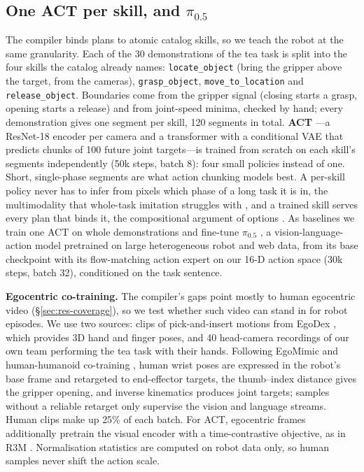 \documentclass[10pt,twocolumn,letterpaper]{article}
\newif\ifprovisional \provisionaltrue
\newcommand{\prov}[1]{\ifprovisional\textcolor{prov}{#1}\else#1\fi}
\newcommand{\code}[1]{\texttt{\small #1}}
\begin{document}
\subsection{One ACT per skill, and \texorpdfstring{$\pi_{0.5}$}{pi0.5}}\label{sec:learn}
The compiler binds plans to atomic catalog skills, so we teach the robot at the same granularity. Each of the 30
demonstrations of the tea task is split into the four skills the catalog already names: \code{locate\_object} (bring
the gripper above the target, from the cameras), \code{grasp\_object}, \code{move\_to\_location} and
\code{release\_object}. Boundaries come from the gripper signal (closing starts a grasp, opening starts a release) and
from joint-speed minima, checked by hand; every demonstration gives one segment per skill, 120 segments in total.
\textbf{ACT} \citep{zhao2023aloha}---a ResNet-18 encoder per camera and a transformer with a conditional VAE that
predicts chunks of 100 future joint targets---is trained from scratch on each skill's segments independently
(\prov{50k} steps, batch 8): four small policies instead of one. Short, single-phase segments are what action chunking
models best. A per-skill policy never has to infer from pixels which phase of a long task it is in, the
multimodality that whole-task imitation struggles with \citep{zhao2023aloha,chi2023diffusion}, and a trained skill
serves every plan that binds it, the compositional argument of options \citep{sutton1999options}. As baselines we train
one ACT on whole demonstrations and fine-tune \textbf{$\pi_{0.5}$} \citep{pi2025pi05}, a vision-language-action model
pretrained on large heterogeneous robot and web data, from its base checkpoint with its flow-matching action expert on
our 16-D action space (\prov{30k} steps, batch \prov{32}), conditioned on the task sentence.

\textbf{Egocentric co-training.} The compiler's gaps point mostly to human egocentric video (\S\ref{sec:res-coverage}),
so we test whether such video can stand in for robot episodes. We use two sources: clips of pick-and-insert motions
from EgoDex \citep{hoque2025egodex}, which provides 3D hand and finger poses, and \prov{40} head-camera recordings of
our own team performing the tea task with their hands. Following EgoMimic \citep{kareer2024egomimic} and human-humanoid
co-training \citep{qiu2025humanoid,nvidia2025groot}, human wrist poses are expressed in the robot's base frame and
retargeted to end-effector targets, the thumb--index distance gives the gripper opening, and inverse kinematics
produces joint targets; samples without a reliable retarget only supervise the vision and language streams. Human
clips make up \prov{25\%} of each batch. For ACT, egocentric frames additionally pretrain the visual encoder with a
time-contrastive objective, as in R3M \citep{nair2022r3m}. Normalisation statistics are computed on robot data only, so
human samples never shift the action scale.
\end{document}
